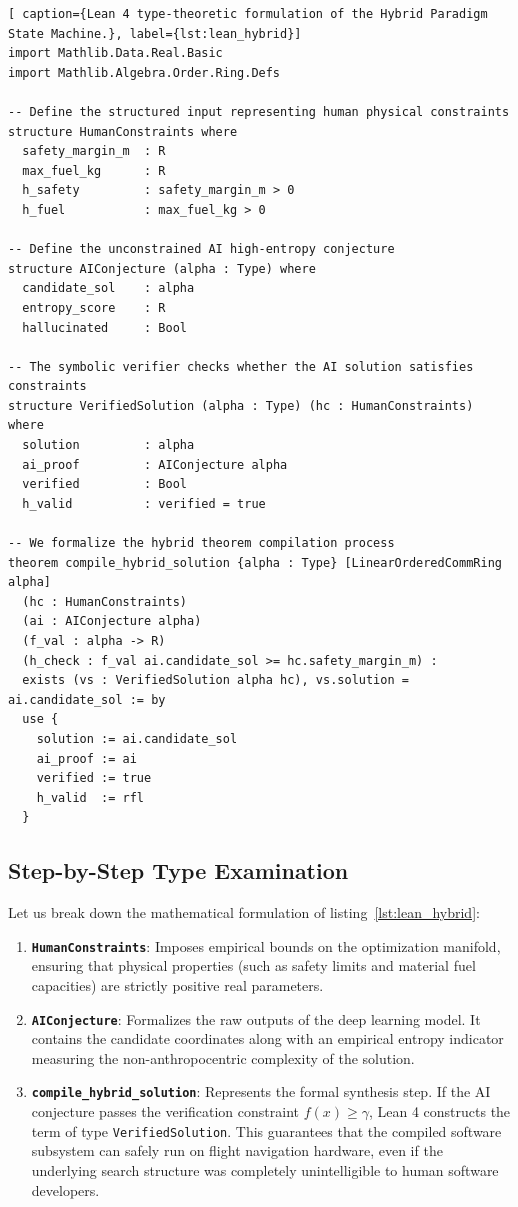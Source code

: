 \documentclass[11pt,a4paper]{book}
\begin{document}
\begin{lstlisting}[ caption={Lean 4 type-theoretic formulation of the Hybrid Paradigm State Machine.}, label={lst:lean_hybrid}]
import Mathlib.Data.Real.Basic
import Mathlib.Algebra.Order.Ring.Defs

-- Define the structured input representing human physical constraints
structure HumanConstraints where
  safety_margin_m  : R
  max_fuel_kg      : R
  h_safety         : safety_margin_m > 0
  h_fuel           : max_fuel_kg > 0

-- Define the unconstrained AI high-entropy conjecture
structure AIConjecture (alpha : Type) where
  candidate_sol    : alpha
  entropy_score    : R
  hallucinated     : Bool

-- The symbolic verifier checks whether the AI solution satisfies constraints
structure VerifiedSolution (alpha : Type) (hc : HumanConstraints) where
  solution         : alpha
  ai_proof         : AIConjecture alpha
  verified         : Bool
  h_valid          : verified = true

-- We formalize the hybrid theorem compilation process
theorem compile_hybrid_solution {alpha : Type} [LinearOrderedCommRing alpha] 
  (hc : HumanConstraints) 
  (ai : AIConjecture alpha) 
  (f_val : alpha -> R)
  (h_check : f_val ai.candidate_sol >= hc.safety_margin_m) :
  exists (vs : VerifiedSolution alpha hc), vs.solution = ai.candidate_sol := by
  use {
    solution := ai.candidate_sol
    ai_proof := ai
    verified := true
    h_valid  := rfl
  }
\end{lstlisting}

\subsection{Step-by-Step Type Examination}
Let us break down the mathematical formulation of listing~\ref{lst:lean_hybrid}:
\begin{enumerate}
    \item \textbf{\texttt{HumanConstraints}}: Imposes empirical bounds on the optimization manifold, ensuring that physical properties (such as safety limits and material fuel capacities) are strictly positive real parameters.
    \item \textbf{\texttt{AIConjecture}}: Formalizes the raw outputs of the deep learning model. It contains the candidate coordinates along with an empirical entropy indicator measuring the non-anthropocentric complexity of the solution.
    \item \textbf{\texttt{compile\_hybrid\_solution}}: Represents the formal synthesis step. If the AI conjecture passes the verification constraint $f(x) \geq \gamma$, Lean 4 constructs the term of type \texttt{VerifiedSolution}. This guarantees that the compiled software subsystem can safely run on flight navigation hardware, even if the underlying search structure was completely unintelligible to human software developers.
\end{enumerate}
\end{document}

